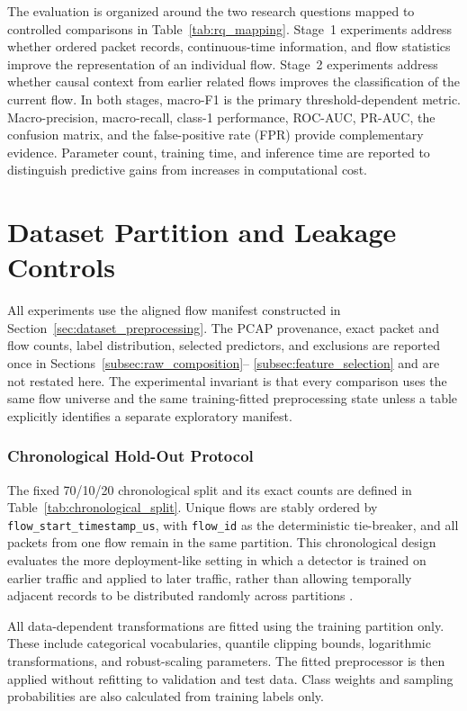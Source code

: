 \documentclass[11pt,fleqn]{report}
\begin{document}
The evaluation is organized around the two research questions mapped to
controlled comparisons in Table~\ref{tab:rq_mapping}. Stage~1 experiments
address whether ordered packet records,
continuous-time information, and flow statistics improve the representation
of an individual flow. Stage~2 experiments address whether causal context from
earlier related flows improves the classification of the current flow. In both
stages, macro-F1 is the primary threshold-dependent metric. Macro-precision,
macro-recall, class-1 performance, ROC-AUC, PR-AUC, the confusion matrix, and
the false-positive rate (FPR) provide complementary evidence. Parameter count,
training time, and inference time are reported to distinguish predictive gains
from increases in computational cost.

\section{Dataset Partition and Leakage Controls}
\label{subsec:experimental_data_protocol}

All experiments use the aligned flow manifest constructed in
Section~\ref{sec:dataset_preprocessing}. The PCAP provenance, exact packet and
flow counts, label distribution, selected predictors, and exclusions are
reported once in Sections~\ref{subsec:raw_composition}--
\ref{subsec:feature_selection} and are not restated here. The experimental
invariant is that every comparison uses the same flow universe and the same
training-fitted preprocessing state unless a table explicitly identifies a
separate exploratory manifest.

\subsubsection{Chronological Hold-Out Protocol}
\label{subsubsec:chronological_holdout}

The fixed 70/10/20 chronological split and its exact counts are defined in
Table~\ref{tab:chronological_split}. Unique flows are stably ordered by
\texttt{flow\_start\_timestamp\_us}, with \texttt{flow\_id} as the
deterministic tie-breaker, and all packets from one flow remain in the same
partition. This chronological design evaluates the more deployment-like
setting in which a detector is trained on earlier traffic and applied to later
traffic, rather than allowing temporally adjacent records to be distributed
randomly across partitions \cite{SommerPaxson2010,Arp2022DosDonts}.

All data-dependent transformations are fitted using the training partition
only. These include categorical vocabularies, quantile clipping bounds,
logarithmic transformations, and robust-scaling parameters. The fitted
preprocessor is then applied without refitting to validation and test data.
Class weights and sampling probabilities are also calculated from training
labels only.
\end{document}
